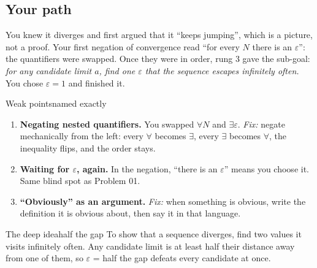 \documentclass{kaelearn}
\begin{document}
\subsection{Your path}
You knew it diverges and first argued that it ``keeps jumping'', which is a picture, not a proof.
Your first negation of convergence read ``for every $N$ there is an $\varepsilon$'': the quantifiers
were swapped. Once they were in order, rung 3 gave the sub-goal: \emph{for any candidate limit $a$,
find one $\varepsilon$ that the sequence escapes infinitely often.} You chose $\varepsilon=1$ and
finished it.

\begin{panel}[unbreakable]{Weak points}{named exactly}{}
\begin{enumerate}
  \item \textbf{Negating nested quantifiers.} You swapped $\forall N$ and $\exists\varepsilon$.
        \emph{Fix:} negate mechanically from the left: every $\forall$ becomes $\exists$, every
        $\exists$ becomes $\forall$, the inequality flips, and the order stays.
  \item \textbf{Waiting for $\varepsilon$, again.} In the negation, ``there is an $\varepsilon$'' means
        you choose it. Same blind spot as Problem 01.
  \item \textbf{``Obviously'' as an argument.} \emph{Fix:} when something is obvious, write the
        definition it is obvious about, then say it in that language.
\end{enumerate}
\end{panel}

\begin{panel}[unbreakable]{The deep idea}{half the gap}{}
To show that a sequence diverges, find two values it visits infinitely often. Any candidate limit is
at least half their distance away from one of them, so $\varepsilon$ = half the gap defeats every
candidate at once.
\end{panel}

\begin{center}
\end{center}
\end{document}

